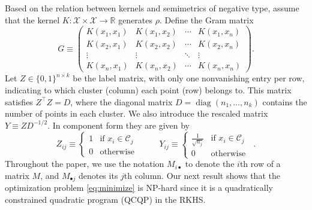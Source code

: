 \documentclass[aps,preprint,nofootinbib,floatfix]{revtex4-1}
\DeclareMathOperator{\diag}{diag}
\newcommand\kk{K}
\newcommand\C{{\mathcal{C}}}
\newcommand\Zt{Y}
\begin{document}
Based on the relation between kernels and semimetrics of negative
type, 
assume that the kernel $\kk: \mathcal{X} \times \mathcal{X} \to \mathbb{R}$ 
generates $\rho$.  Define  the Gram matrix
\begin{equation}
\label{eq:kernel_matrix}
G \equiv \begin{pmatrix}
\kk(x_1,x_1) & \kk(x_1,x_2) & \dotsm & \kk(x_1,x_n) \\
\kk(x_2,x_1) & \kk(x_2,x_2) & \dotsm & \kk(x_2,x_n) \\
\vdots & \vdots & \ddots  & \vdots \\
\kk(x_n,x_1) & \kk(x_n,x_2) & \dotsm & \kk(x_n,x_n) 
\end{pmatrix} .
\end{equation}
Let $Z \in \{ 0,1 \}^{n\times k}$ be the label matrix, 
with only one nonvanishing entry per row, 
indicating to which cluster (column)
each point (row) belongs to. This matrix satisfies
$Z^\top Z = D$, where the diagonal matrix 
$D = \diag( n_1,\dotsc, n_k )$  contains
the number of points in each cluster. We also introduce the rescaled
matrix  $Y \equiv Z D^{-1/2}$. In component form they are given by
\begin{equation}
\label{eq:label_matrix}
Z_{ij} \equiv \begin{cases}
1 & \mbox{if $x_i \in \C_j$ } \\
0 & \mbox{otherwise}
\end{cases} \qquad
\Zt_{ij} \equiv \begin{cases}
\tfrac{1}{\sqrt{n_j}} & \mbox{if $x_i \in \C_j$ } \\
0 & \mbox{otherwise}
\end{cases} .
\end{equation}
Throughout the paper, we use the notation $M_{i\bullet}$ to denote
the $i$th row of a matrix $M$, and $M_{\bullet j}$ denotes its $j$th column.
Our next result shows that the optimization problem \eqref{eq:minimize}
is NP-hard since
it is a quadratically constrained quadratic program (QCQP) in the RKHS.
\end{document}
